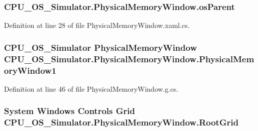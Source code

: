 \subsubsection[{os\+Parent}]{ C\+P\+U\+\_\+\+O\+S\+\_\+\+Simulator.\+Physical\+Memory\+Window.\+os\+Parent\hspace{0.3cm}{\ttfamily [private]}}\label{class_c_p_u___o_s___simulator_1_1_physical_memory_window_aa188424c9a32a838fc49c5411e3ebc99}


Definition at line 28 of file Physical\+Memory\+Window.\+xaml.\+cs.

\hypertarget{class_c_p_u___o_s___simulator_1_1_physical_memory_window_a39cc526d8fdaf4273ec0dd5c6c3d6c80}{}
\subsubsection[{Physical\+Memory\+Window1}]{\setlength{\rightskip}{0pt plus 5cm}C\+P\+U\+\_\+\+O\+S\+\_\+\+Simulator {\bf Physical\+Memory\+Window} C\+P\+U\+\_\+\+O\+S\+\_\+\+Simulator.\+Physical\+Memory\+Window.\+Physical\+Memory\+Window1\hspace{0.3cm}{\ttfamily [package]}}\label{class_c_p_u___o_s___simulator_1_1_physical_memory_window_a39cc526d8fdaf4273ec0dd5c6c3d6c80}


Definition at line 46 of file Physical\+Memory\+Window.\+g.\+cs.

\hypertarget{class_c_p_u___o_s___simulator_1_1_physical_memory_window_adc6eedac01af3196b12b373ce81191b5}{}
\subsubsection[{Root\+Grid}]{\setlength{\rightskip}{0pt plus 5cm}System Windows Controls Grid C\+P\+U\+\_\+\+O\+S\+\_\+\+Simulator.\+Physical\+Memory\+Window.\+Root\+Grid\hspace{0.3cm}{\ttfamily [package]}}\label{class_c_p_u___o_s___simulator_1_1_physical_memory_window_adc6eedac01af3196b12b373ce81191b5}


